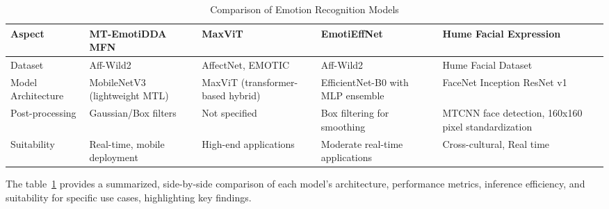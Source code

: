 \begin{table}[h!]
\centering
\caption{Comparison of Emotion Recognition Models}
\begin{tabularx}{\textwidth}{|>{\raggedright\arraybackslash}X|>{\raggedright\arraybackslash}X|>{\raggedright\arraybackslash}X|>{\raggedright\arraybackslash}X|>{\raggedright\arraybackslash}X|}
\hline
\textbf{Aspect} & \textbf{MT-EmotiDDA MFN} & \textbf{MaxViT} & \textbf{EmotiEffNet} & \textbf{Hume Facial Expression} \\
\hline
Dataset 
    & Aff-Wild2 
    & AffectNet, EMOTIC 
    & Aff-Wild2 
    & Hume Facial Dataset \\
\hline
Model Architecture 
    & MobileNetV3 (lightweight MTL) 
    & MaxViT (transformer-based hybrid) 
    & EfficientNet-B0 with MLP ensemble 
    & FaceNet Inception ResNet v1 \\
\hline
Post-processing 
    & Gaussian/Box filters 
    & Not specified 
    & Box filtering for smoothing 
    & MTCNN face detection, 160x160 pixel standardization  \\
\hline
Suitability 
    & Real-time, mobile deployment 
    & High-end applications 
    & Moderate real-time applications 
    & Cross-cultural, Real time\\
\hline
\end{tabularx}
\label{tab:model_comparison}
\end{table}

The table~\ref{tab:model_comparison} provides a summarized, side-by-side comparison of each model's architecture, performance metrics, inference efficiency, and suitability for specific use cases, highlighting key findings.
